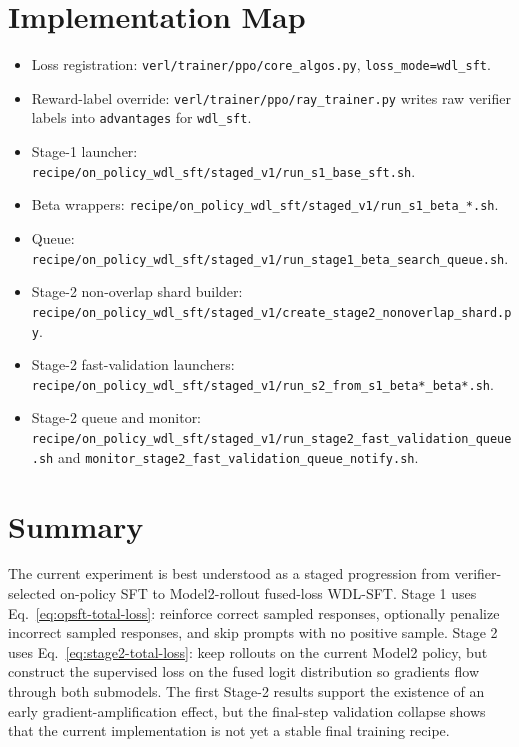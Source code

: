 \section{Implementation Map}
\label{sec:opsft-implementation}

\begin{itemize}[leftmargin=1.5em]
    \item Loss registration: \texttt{verl/trainer/ppo/core\_algos.py}, \texttt{loss\_mode=wdl\_sft}.
    \item Reward-label override: \texttt{verl/trainer/ppo/ray\_trainer.py} writes raw verifier labels into \texttt{advantages} for \texttt{wdl\_sft}.
    \item Stage-1 launcher: \texttt{recipe/on\_policy\_wdl\_sft/staged\_v1/run\_s1\_base\_sft.sh}.
    \item Beta wrappers: \texttt{recipe/on\_policy\_wdl\_sft/staged\_v1/run\_s1\_beta\_*.sh}.
    \item Queue: \texttt{recipe/on\_policy\_wdl\_sft/staged\_v1/run\_stage1\_beta\_search\_queue.sh}.
    \item Stage-2 non-overlap shard builder: \texttt{recipe/on\_policy\_wdl\_sft/staged\_v1/create\_stage2\_nonoverlap\_shard.py}.
    \item Stage-2 fast-validation launchers: \texttt{recipe/on\_policy\_wdl\_sft/staged\_v1/run\_s2\_from\_s1\_beta*\_beta*.sh}.
    \item Stage-2 queue and monitor: \texttt{recipe/on\_policy\_wdl\_sft/staged\_v1/run\_stage2\_fast\_validation\_queue.sh} and \texttt{monitor\_stage2\_fast\_validation\_queue\_notify.sh}.
\end{itemize}

\section{Summary}
\label{sec:opsft-summary}

The current experiment is best understood as a staged progression from
verifier-selected on-policy SFT to Model2-rollout fused-loss WDL-SFT. Stage 1
uses Eq.~\eqref{eq:opsft-total-loss}: reinforce correct sampled responses,
optionally penalize incorrect sampled responses, and skip prompts with no
positive sample. Stage 2 uses Eq.~\eqref{eq:stage2-total-loss}: keep rollouts on
the current Model2 policy, but construct the supervised loss on the fused
logit distribution so gradients flow through both submodels. The first
Stage-2 results support the existence of an early gradient-amplification
effect, but the final-step validation collapse shows that the current
implementation is not yet a stable final training recipe.
